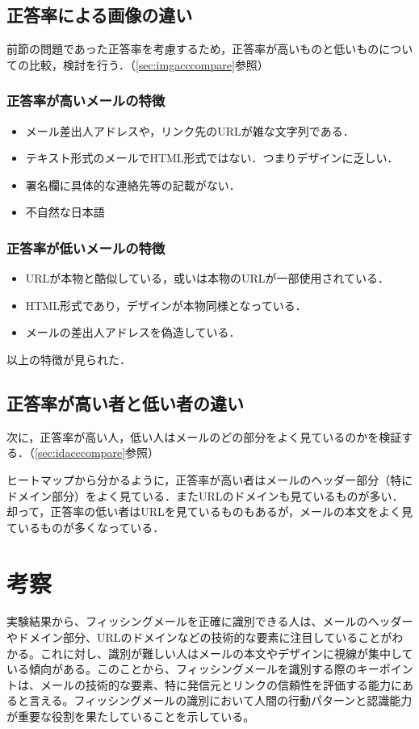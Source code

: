 \documentclass[a4paper,11pt]{ltjsreport}
\begin{document}
\subsection{正答率による画像の違い}
前節の問題であった正答率を考慮するため，正答率が高いものと低いものについての比較，検討を行う．（\ref{sec:imgacccompare}参照）

\subsubsection{正答率が高いメールの特徴}
\begin{itemize}
	\item メール差出人アドレスや，リンク先のURLが雑な文字列である．
	\item テキスト形式のメールでHTML形式ではない．つまりデザインに乏しい．
	\item 署名欄に具体的な連絡先等の記載がない．
	\item 不自然な日本語
\end{itemize}

\subsubsection{正答率が低いメールの特徴}
\begin{itemize}
	\item URLが本物と酷似している，或いは本物のURLが一部使用されている．
	\item HTML形式であり，デザインが本物同様となっている．
	\item メールの差出人アドレスを偽造している．
\end{itemize}

以上の特徴が見られた．
\clearpage


\subsection{正答率が高い者と低い者の違い}
次に，正答率が高い人，低い人はメールのどの部分をよく見ているのかを検証する．（\ref{sec:idacccompare}参照）

ヒートマップから分かるように，正答率が高い者はメールのヘッダー部分（特にドメイン部分）をよく見ている．またURLのドメインも見ているものが多い．却って，正答率の低い者はURLを見ているものもあるが，メールの本文をよく見ているものが多くなっている．

\section{考察}
実験結果から、フィッシングメールを正確に識別できる人は、メールのヘッダーやドメイン部分、URLのドメインなどの技術的な要素に注目していることがわかる。これに対し、識別が難しい人はメールの本文やデザインに視線が集中している傾向がある。このことから、フィッシングメールを識別する際のキーポイントは、メールの技術的な要素、特に発信元とリンクの信頼性を評価する能力にあると言える。フィッシングメールの識別において人間の行動パターンと認識能力が重要な役割を果たしていることを示している。
\end{document}
